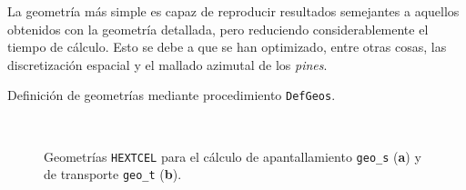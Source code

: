 \documentclass[11pt]{article}
\begin{document}
La geometría más simple es capaz de reproducir resultados semejantes a aquellos obtenidos con la geometría detallada, pero reduciendo considerablemente el tiempo de cálculo. Esto se debe a que se han optimizado, entre otras cosas, las discretización espacial y el mallado azimutal de los \emph{pines}.

\medskip
\begin{algorithm}[H]
 
 
 \caption{Definición de geometrías mediante procedimiento \texttt{DefGeos}.\label{algo:defgeos}}
\end{algorithm}
\medskip

\begin{figure}[!h]
 \begin{center}
  \\
  \caption{Geometrías \texttt{HEXTCEL} para el cálculo de apantallamiento \texttt{geo_s} (\textbf{a}) y de transporte \texttt{geo_t} (\textbf{b}).}
  \label{fig:geos-nxt}
 \end{center}
\end{figure}
\end{document}
